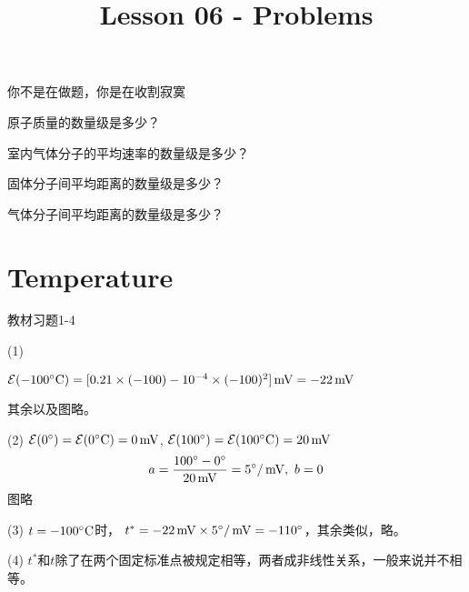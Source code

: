 \documentclass[CJK]{beamer}
\title{Lesson 06 - Problems}
\author{}
\date{}
\begin{document}

\begin{frame}
\bch


你不是在做题，你是在收割寂寞
\ech
\end{frame}

\begin{frame}
\bch
\bitem
\item{原子质量的数量级是多少？}
\eitem
\ech
\end{frame}


\begin{frame}
\bch
\bitem
\item{室内气体分子的平均速率的数量级是多少？}
\eitem
\ech
\end{frame}

\begin{frame}
\bch
\bitem
\item{固体分子间平均距离的数量级是多少？}
\eitem
\ech
\end{frame}

\begin{frame}
\bch
\bitem
\item{气体分子间平均距离的数量级是多少？}
\eitem
\ech
\end{frame}

\section{Temperature}

\begin{frame}
\bch
{\blue 教材习题1-4}

{\scriptsize
\bitem
\item[(1)]{$\mathcal{E}(-100^\circ \mathrm{C}) = [0.21\times (-100) - 10^{-4}\times (-100)^2] \,\mathrm{mV} = -22 \,\mathrm{mV}$

其余以及图略。}
\item[(2)]{ $\mathcal{E}(0^\circ) =\mathcal{E}(0^\circ \mathrm{C}) = 0 \,\mathrm{mV}$, $\mathcal{E}(100^\circ) = \mathcal{E}(100^\circ \mathrm{C}) = 20 \,\mathrm{mV}$
$$a = \frac{100^\circ - 0^\circ}{20\,\mathrm{mV}} =5 ^\circ/\,\mathrm{mV},\ b = 0$$ 图略}
\item[(3)]{$t = -100^\circ \mathrm{C}$时， $t^*=-22\,\mathrm{mV} \times 5^\circ/\,\mathrm{mV} = -110^\circ$，其余类似，略。}
\item[(4)]{$t^*$和$t$除了在两个固定标准点被规定相等，两者成非线性关系，一般来说并不相等。}
\eitem
}
\ech
\end{frame}
\end{document}
